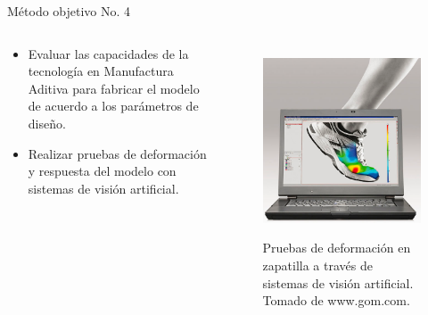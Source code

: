\documentclass[10pt]{beamer}
\begin{document}
\begin{frame}{Método objetivo No. 4}

\begin{columns}[t]


\column{50 mm}
\begin{exampleblock}{}

\begin{itemize}
\item {\footnotesize{}Evaluar las capacidades de la tecnología en Manufactura
Aditiva para fabricar el modelo de acuerdo a los parámetros de diseño.}{\footnotesize \par}
\item {\footnotesize{}Realizar pruebas de deformación y respuesta del modelo
con sistemas de visión artificial.}{\footnotesize \par}
\end{itemize}
\end{exampleblock}

\column{60 mm}

\begin{figure}
\begin{centering}
{\scriptsize{}\includegraphics[scale=0.23]{Feathergraphics/strainshoe}}
\par\end{centering}{\scriptsize \par}
\caption{{\scriptsize{}Pruebas de deformación en zapatilla a través de sistemas
de visión artificial. Tomado de www.gom.com.}}
\end{figure}

\end{columns}

\end{frame}
\end{document}
